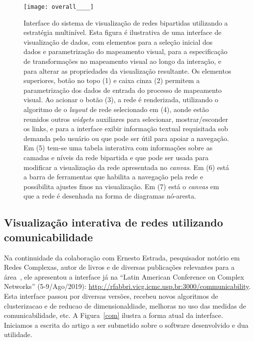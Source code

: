 \documentclass[a4paper, 11pt]{article}
\begin{document}
\begin{figure}[h!]
\centering
  \texttt{[image: overall\_\_\_\_]}
\caption{%
  Interface do sistema de visualização de redes bipartidas utilizando a estratégia multinível.
  Esta figura é ilustrativa de uma interface de visualização de dados, com elementos para a seleção inicial dos dados e parametrização do mapeamento visual, para a especificação de transformações no mapeamento visual ao longo da interação, e para alterar as propriedades da visualização resultante.
  Os elementos superiores, botão no topo (1) e caixa cinza (2) permitem a parametrização dos dados de entrada do processo de mapeamento visual.
  Ao acionar o botão (3), a rede é renderizada, utilizando o algoritmo de o \emph{layout} de rede selecionado em (4), aonde estão reunidos outros \emph{widgets} auxiliares para selecionar,
  mostrar/esconder os links,
  e para a interface exibir informação textual requisitada sob demanda
  pelo usuário ou que pode ser útil para apoiar a navegação.
  Em (5) tem-se uma tabela interativa com informações sobre as camadas e níveis
  da rede bipartida e que pode ser usada para modificar a visualização da rede apresentada no \emph{canvas}.
  Em (6) está a barra de ferramentas que habilita a navegação pela rede e
  possibilita ajustes finos na visualização.
  Em (7) está o \emph{canvas} em que a rede é desenhada na forma de diagramas nó-aresta.
}\label{ml}
\end{figure}

\subsection{Visualização interativa de redes utilizando comunicabilidade}\label{scom}
Na continuidade da colaboração com Ernesto Estrada, pesquisador notório em Redes Complexas, autor de livros e de diversas publicações relevantes para a área~\cite{ern1,ern2,ern3,ern4},
ele apresentou a interface já na ``Latin American Conference on Complex Networks'' (5-9/Ago/2019):
\url{http://rfabbri.vicg.icmc.usp.br:3000/communicability}.
Esta interface passou por diversas versões, recebeu novos algoritmos de clusterizacao e de reducao de dimensionaldiade, melhoras no uso das medidas de comunicabilidade, etc. A Figura~\ref{com} ilustra a forma atual da interface.
Iniciamos a escrita do artigo a ser submetido sobre o software desenvolvido e dua utilidade.
\end{document}
